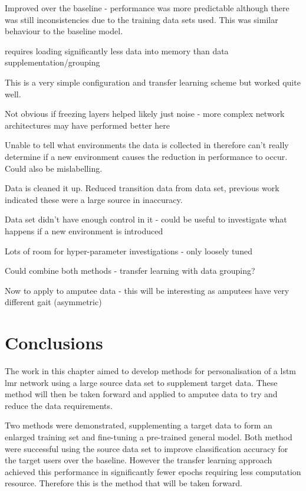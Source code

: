 Improved over the baseline - performance was more predictable although there was still inconsistencies due to the training data sets used. This was similar behaviour to the baseline model.

requires loading significantly less data into memory than data supplementation/grouping


This is a very simple configuration and transfer learning scheme but worked quite well. 

Not obvious if freezing layers helped likely just noise - more complex network architectures may have performed better here


Unable to tell what environments the data is collected in therefore can't really determine if a new environment causes the reduction in performance to occur. Could also be mislabelling.

Data is cleaned it up. Reduced transition data from data set, previous work indicated these were a large source in inaccuracy.

Data set didn't have enough control in it - could be useful to investigate what happens if a new environment is introduced


Lots of room for hyper-parameter investigations - only loosely tuned


Could combine both methods - transfer learning with data grouping?

Now to apply to amputee data - this will be interesting as amputees have very different gait (asymmetric)


\section{Conclusions}
\label{sec:personalisation-conclusions}
The work in this chapter aimed to develop methods for personalisation of a \acrshort{lstm} \acrshort{lmr} network using a large source data set to supplement target data. These method will then be taken forward and applied to amputee data to try and reduce the data requirements.

Two methods were demonstrated, supplementing a target data to form an enlarged training set and fine-tuning a pre-trained general model. Both method were successful using the source data set to improve classification accuracy for the target users over the baseline. However the transfer learning approach achieved this performance in significantly fewer epochs requiring less computation resource. Therefore this is the method that will be taken forward.

